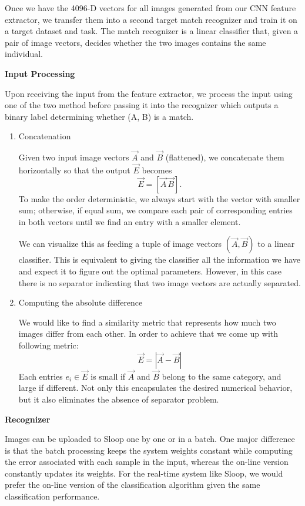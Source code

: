 Once we have the 4096-D vectors for all images generated from our CNN feature
extractor, we transfer them into a second target match recognizer and train it
on a target dataset and task. The match recognizer is a linear classifier that,
given a pair of image vectors, decides whether the two images contains the same
individual.

\textbf{Input Processing}

Upon receiving the input from the feature extractor, we process the input using
one of the two method before passing it into the recognizer which outputs a
binary label determining whether (A, B) is a match.

\begin{enumerate}
\item Concatenation

Given two input image vectors $\vec{A}$ and $\vec{B}$ (flattened), we
concatenate them horizontally so that the output $\vec{E}$ becomes $$\vec{E} =
[ \vec{A}\, \vec{B} ].$$ To make the order deterministic, we always start with
the vector with smaller sum; otherwise, if equal sum, we compare each pair of
corresponding entries in both vectors until we find an entry with a smaller
element.

We can visualize this as feeding a tuple of image vectors $( \vec{A}, \vec{B}
)$ to a linear classifier. This is equivalent to giving the classifier all the
information we have and expect it to figure out the optimal parameters.
However, in this case there is no separator indicating that two image vectors
are actually separated.

\item Computing the absolute difference

We would like to find a similarity metric that represents how much two images
differ from each other. In order to achieve that we come up with following
metric:
$$\vec{E} = |\vec{A} - \vec{B}|$$
Each entries $e_i \in \vec{E}$ is
small if $\vec{A}$ and $\vec{B}$ belong to the same category, and large if
different.  Not only this encapsulates the desired numerical behavior, but it
also eliminates the absence of separator problem.
  
\end{enumerate}

\textbf{Recognizer}

Images can be uploaded to Sloop one by one or in a batch. One major difference
is that the batch processing keeps the system weights constant while computing
the error associated with each sample in the input, whereas the on-line version
constantly updates its weights. For the real-time system like Sloop, we would
prefer the on-line version of the classification algorithm given the same
classification performance.

